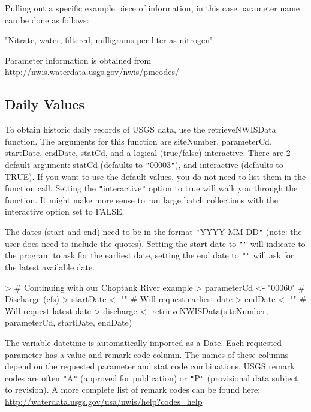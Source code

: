 \documentclass[a4paper,11pt]{article}
\begin{document}
Pulling out a specific example piece of information, in this case parameter name can be done as follows:
\begin{Schunk}
\begin{Soutput}
[1] "Nitrate, water, filtered, milligrams per liter as nitrogen"
\end{Soutput}
\end{Schunk}
Parameter information is obtained from \url{http://nwis.waterdata.usgs.gov/nwis/pmcodes/}
\FloatBarrier
\subsection{Daily Values}
\label{sec:usgsDaily}
To obtain historic daily records of USGS data, use the retrieveNWISData function. The arguments for this function are siteNumber, parameterCd, startDate, endDate, statCd, and a logical (true/false) interactive. There are 2 default argument: statCd (defaults to \texttt{"}00003\texttt{"}), and interactive (defaults to TRUE).  If you want to use the default values, you do not need to list them in the function call. Setting the \texttt{"}interactive\texttt{"} option to true will walk you through the function. It might make more sense to run large batch collections with the interactive option set to FALSE. 

The dates (start and end) need to be in the format \texttt{"}YYYY-MM-DD\texttt{"} (note: the user does need to include the quotes).  Setting the start date to \texttt{"}\texttt{"} will indicate to the program to ask for the earliest date, setting the end date to \texttt{"}\texttt{"} will ask for the latest available date.

\begin{Schunk}
\begin{Sinput}
> # Continuing with our Choptank River example
> parameterCd <- "00060"  # Discharge (cfs)
> startDate <- ""  # Will request earliest date
> endDate <- "" # Will request latest date
> discharge <- retrieveNWISData(siteNumber, parameterCd, startDate, endDate)
\end{Sinput}
\end{Schunk}

The variable datetime is automatically imported as a Date. Each requested parameter has a value and remark code column.  The names of these columns depend on the requested parameter and stat code combinations. USGS remark codes are often \texttt{"}A\texttt{"} (approved for publication) or \texttt{"}P\texttt{"} (provisional data subject to revision). A more complete list of remark codes can be found here:
\url{http://waterdata.usgs.gov/usa/nwis/help?codes_help}
\end{document}
